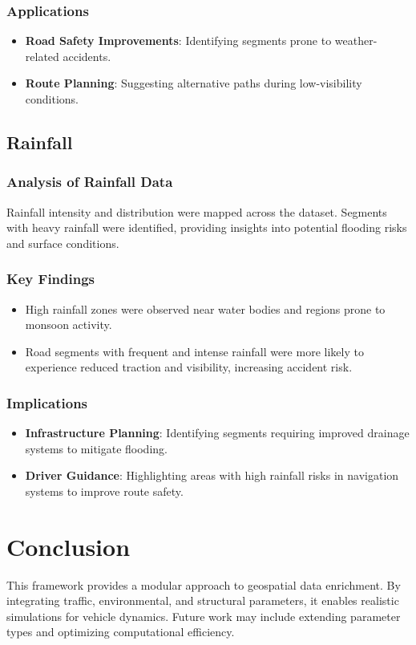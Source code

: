 \documentclass[sigplan,screen]{acmart}
\begin{document}
\subsubsection{Applications}
\begin{itemize}
    \item \textbf{Road Safety Improvements}: Identifying segments prone to weather-related accidents.
    \item \textbf{Route Planning}: Suggesting alternative paths during low-visibility conditions.
\end{itemize}

\subsection{Rainfall}
\subsubsection{Analysis of Rainfall Data}
Rainfall intensity and distribution were mapped across the dataset. Segments with heavy rainfall were identified, providing insights into potential flooding risks and surface conditions.

\subsubsection{Key Findings}
\begin{itemize}
    \item High rainfall zones were observed near water bodies and regions prone to monsoon activity.
    \item Road segments with frequent and intense rainfall were more likely to experience reduced traction and visibility, increasing accident risk.
\end{itemize}

\subsubsection{Implications}
\begin{itemize}
    \item \textbf{Infrastructure Planning}: Identifying segments requiring improved drainage systems to mitigate flooding.
    \item \textbf{Driver Guidance}: Highlighting areas with high rainfall risks in navigation systems to improve route safety.
\end{itemize}


\section{Conclusion}
This framework provides a modular approach to geospatial data enrichment. By integrating traffic, environmental, and structural parameters, it enables realistic simulations for vehicle dynamics. Future work may include extending parameter types and optimizing computational efficiency.
\end{document}
